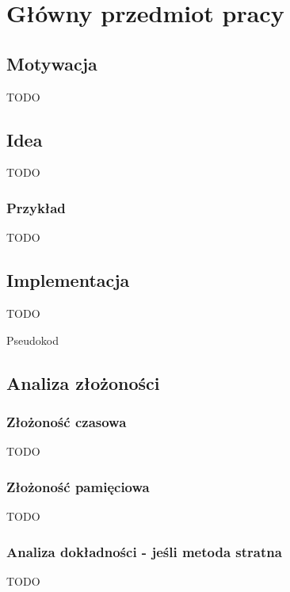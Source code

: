 \chapter{Główny przedmiot pracy}
\section{Motywacja}
    TODO

\section{Idea}
    TODO

    \subsection{Przykład}
        TODO

\section{Implementacja}
    TODO

    Pseudokod

\section{Analiza złożoności}

    \subsection{Złożoność czasowa}
        TODO

    
    \subsection{Złożoność pamięciowa}
        TODO


    \subsection{Analiza dokładności - jeśli metoda stratna}
        TODO